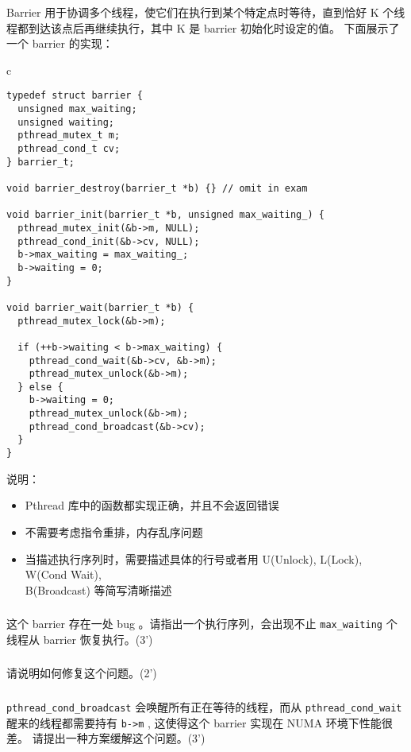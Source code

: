 \documentclass[a4paper,12pt]{article}
\begin{document}
Barrier 用于协调多个线程，使它们在执行到某个特定点时等待，直到恰好 K 个线程都到达该点后再继续执行，其中 K 是 barrier 初始化时设定的值。
下面展示了一个 barrier 的实现：

\begin{table}[htb]
  \centering
  \begin{tabular}{c}
    \begin{lstlisting}
typedef struct barrier {
  unsigned max_waiting;
  unsigned waiting;
  pthread_mutex_t m;
  pthread_cond_t cv;
} barrier_t;

void barrier_destroy(barrier_t *b) {} // omit in exam

void barrier_init(barrier_t *b, unsigned max_waiting_) {
  pthread_mutex_init(&b->m, NULL);
  pthread_cond_init(&b->cv, NULL);
  b->max_waiting = max_waiting_;
  b->waiting = 0;
}

void barrier_wait(barrier_t *b) {
  pthread_mutex_lock(&b->m);

  if (++b->waiting < b->max_waiting) {
    pthread_cond_wait(&b->cv, &b->m);
    pthread_mutex_unlock(&b->m);
  } else {
    b->waiting = 0;
    pthread_mutex_unlock(&b->m);
    pthread_cond_broadcast(&b->cv);
  }
}
    \end{lstlisting}
  \end{tabular}
\end{table}



说明：

\begin{itemize}
  \item Pthread 库中的函数都实现正确，并且不会返回错误
  \item 不需要考虑指令重排，内存乱序问题
  \item 当描述执行序列时，需要描述具体的行号或者用 U(Unlock), L(Lock), W(Cond Wait), \\
        B(Broadcast) 等简写清晰描述
\end{itemize}


\subsubsection{}

这个 barrier 存在一处 bug 。请指出一个执行序列，会出现不止 \verb|max_waiting| 个线程从 barrier 恢复执行。(3')

\subsubsection{}

请说明如何修复这个问题。(2')

\subsubsection{}

\verb|pthread_cond_broadcast| 会唤醒所有正在等待的线程，而从 \verb|pthread_cond_wait| 醒来的线程都需要持有 \verb|b->m| , 这使得这个 barrier 实现在 NUMA 环境下性能很差。
请提出一种方案缓解这个问题。(3')


\label{LastPage}
\end{document}
